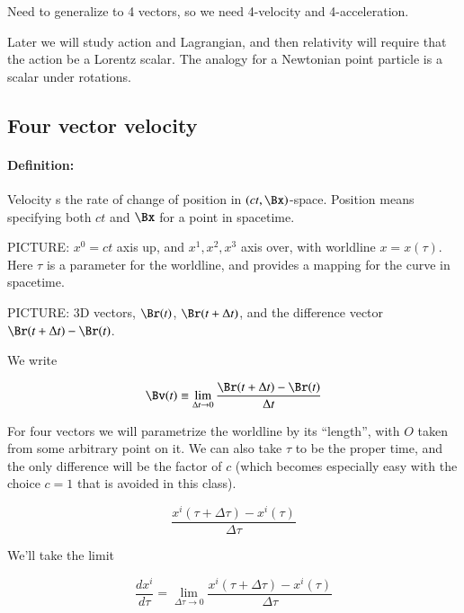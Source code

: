 Need to generalize to 4 vectors, so we need 4-velocity and 4-acceleration.

Later we will study action and Lagrangian, and then relativity will require that the action be a Lorentz scalar.  The analogy for a Newtonian point particle is a scalar under rotations.

\subsection{Four vector velocity}

\paragraph{Definition:} Velocity s the rate of change of position in $(ct, \Bx)$-space.  Position means specifying both $ct$ and $\Bx$ for a point in spacetime.

PICTURE: $x^0 = ct$ axis up, and $x^1, x^2, x^3$ axis over, with worldline $x = x(\tau)$.  Here $\tau$ is a parameter for the worldline, and provides a mapping for the curve in spacetime.

PICTURE: 3D vectors, $\Br(t)$, $\Br(t + \Delta t)$, and the difference vector $\Br(t + \Delta t) - \Br(t)$.

We write

\begin{equation}\label{eqn:relativisticElectrodynamicsL7:40}
\Bv(t) \equiv \lim_{\Delta t \rightarrow 0} \frac{\Br(t + \Delta t) - \Br(t)}{ \Delta t}
\end{equation}

For four vectors we will parametrize the worldline by its ``length'', with $O$ taken from some arbitrary point on it.  We can also take $\tau$ to be the proper time, and the only difference will be the factor of $c$ (which becomes especially easy with the choice $c=1$ that is avoided in this class).

\begin{equation}\label{eqn:relativisticElectrodynamicsL7:50}
\frac{x^i(\tau + \Delta \tau) - x^i(\tau)}{\Delta \tau}
\end{equation}

We'll take the limit

\begin{equation}\label{eqn:relativisticElectrodynamicsL7:60}
\frac{dx^i}{d\tau} =
\lim_{\Delta \tau \rightarrow 0} 
\frac{x^i(\tau + \Delta \tau) - x^i(\tau)}{\Delta \tau}
\end{equation}

